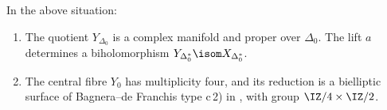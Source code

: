 \begin{prop}\label{prop: log transform at 0}
In the above situation:
\begin{enumerate}
 \item The quotient $Y_{\Delta_0}$ is a complex manifold and proper over $\Delta_0$.
 The lift $a$ determines a biholomorphism
 $Y_{\Delta_0^*}\isom X_{\Delta_0^*}$.

 \item The central fibre
 $Y_0$
 has multiplicity four, and its reduction
 is a bielliptic surface of Bagnera--de Franchis type c\,2) in
 \cite[V.5]{BHPV2004}, with group $\IZ/4\times\IZ/2$.
\end{enumerate}
\end{prop}